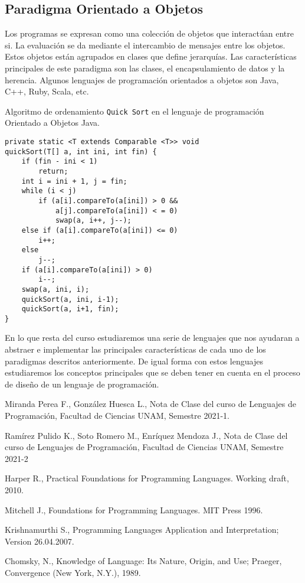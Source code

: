\documentclass[12pt]{extarticle}
\begin{document}
\subsection{Paradigma Orientado a Objetos}
Los programas se expresan como una colección de objetos que interactúan entre si. La evaluación se da mediante el intercambio de mensajes entre los objetos. Estos objetos están agrupados en clases que define jerarquías. Las características principales de este paradigma son las clases, el encapsulamiento de datos y la herencia. Algunos lenguajes de programación orientados a objetos son {\sf Java}, {\sf C++}, {\sf Ruby}, {\sf Scala}, etc.
\begin{example}
Algoritmo de ordenamiento {\tt Quick Sort} en el lenguaje de programación Orientado a Objetos {\sf Java}.
    \begin{code2}
\begin{verbatim}
private static <T extends Comparable <T>> void 
quickSort(T[] a, int ini, int fin) {
    if (fin - ini < 1)
        return;
    int i = ini + 1, j = fin;
    while (i < j)
        if (a[i].compareTo(a[ini]) > 0 &&
            a[j].compareTo(a[ini]) < = 0)
            swap(a, i++, j--);
    else if (a[i].compareTo(a[ini]) <= 0)
        i++;
    else
        j--;
    if (a[i].compareTo(a[ini]) > 0)
        i--;
    swap(a, ini, i);
    quickSort(a, ini, i-1);
    quickSort(a, i+1, fin);
}
    \end{verbatim}
    \end{code2}
\end{example}

\bigskip

En lo que resta del curso estudiaremos una serie de lenguajes que nos ayudaran a abstraer e implementar las principales características de cada uno de los paradigmas descritos anteriormente. De igual forma con estos lenguajes estudiaremos los conceptos principales que se deben tener en cuenta en el proceso de diseño de un lenguaje de programación. 

\begin{thebibliography}{9}

Miranda Perea F., González Huesca L., Nota de Clase del curso de Lenguajes de Programación, Facultad de Ciencias UNAM, Semestre 2021-1.

Ramírez Pulido K., Soto Romero M., Enríquez Mendoza J., Nota de Clase del curso de Lenguajes de Programación, Facultad de Ciencias UNAM, Semestre 2021-2

Harper R., Practical Foundations for Programming Languages. Working draft, 2010.

Mitchell J., Foundations for Programming Languages. MIT Press 1996.

Krishnamurthi S., Programming Languages Application and Interpretation; Version 26.04.2007.

Chomsky, N., Knowledge of Language: Its Nature, Origin, and Use; Praeger, Convergence (New York, N.Y.), 1989.

\end{thebibliography}
\end{document}
